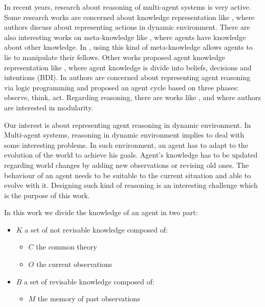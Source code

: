 \documentclass{aamas2012}
\begin{document}
	In recent years, research about reasoning of multi-agent systems is very active.
	Some research works are concerned about knowledge representation like \cite{DBLP:conf/birthday/BaralG11},
	where authors discuss about representing actions in dynamic environment.
	There are also interesting works on meta-knowledge like \cite{DBLP:conf/atal/BaralGSP10}, 
	where agents have knowledge about other knowledge.
	In \cite{DBLP:conf/ijcai/SakamaSP11}, using this kind of meta-knowledge allows agents to lie to manipulate their fellows.
	Other works proposed agent knowledge representation like \cite{DBLP:conf/icmas/RaoG95}, 
	where agent knowledge is divide into beliefs, decisions and intentions (BDI).
	In \cite{DBLP:journals/amai/KowalskiS99} authors are concerned about representing agent reasoning via logic programming 
	and proposed an agent cycle based on three phases: observe, think, act.
	Regarding reasoning, there are works like \cite{DBLP:conf/datalog/Costantini10}, \cite{DBLP:conf/lpnmr/Costantini09}
	and \cite{DBLP:conf/aaaiss/BaralAD06} where authors are interested in modularity.
	
	Our interest is about representing agent reasoning in dynamic environment.
	In Multi-agent systems, reasoning in dynamic environment implies to deal with some interesting problems.
	In such environment, an agent has to adapt to the evolution of the world to achieve his goals.
	Agent's knowledge has to be updated regarding world changes by adding new observations or revising old ones.
	The behaviour of an agent needs to be suitable to the current situation and able to evolve with it.
	Designing such kind of reasoning is an interesting challenge which is the purpose of this work.

	In this work we divide the knowledge of an agent in two part:\newline
		\begin{itemize}
			\item $K$ a set of not revisable knowledge composed of:
			\begin{itemize}
				\item $C$ the common theory
				\item $O$ the current observations
			\end{itemize}
			\item $B$ a set of revisable knowledge composed of:
			\begin{itemize}
				\item $M$ the memory of past observations 
			\end{itemize}
		\end{itemize}
	
\end{document}
